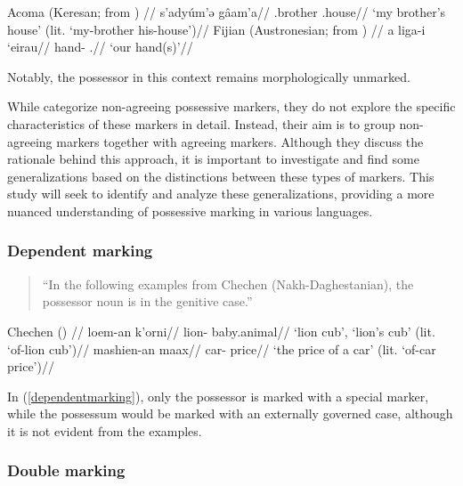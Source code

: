 \pex\label{headmarking}
\a
\begingl
\glpreamble Acoma (Keresan; \citealt[177]{Miller-1965} from \citealt{nichols_locus_2013}) //
\gla s'adyúm'ə gâam'a//
\glb \Fsg.brother \Tsg.house//
\glft `my brother's house' (lit. `my-brother his-house')//
\endgl
\a
\begingl
\glpreamble Fijian (Austronesian; \citealt[36]{Dixon-1988} from \citealt{nichols_locus_2013}) //
\gla a liga-i ‘eirau//
\glb \Art{} hand-\Poss{} \Fdu.\Excl{}//
\glft `our hand(s)'//
\endgl

\xe 

Notably, the possessor in this context remains morphologically unmarked.

While \cite{nichols_locus_2013} categorize non-agreeing possessive markers, they do not explore the specific characteristics of these markers in detail. Instead, their aim is to group non-agreeing markers together with agreeing markers. Although they discuss the rationale behind this approach, it is important to investigate and find some generalizations based on the distinctions between these types of markers. This study will seek to identify and analyze these generalizations, providing a more nuanced understanding of possessive marking in various languages.


\subsubsection{Dependent marking}

\begin{quote}
    ``In the following examples from Chechen (Nakh-Daghestanian), the possessor noun is in the genitive case.'' \citep{nichols_locus_2013}
\end{quote}


\pex\label{dependentmarking}
\glpreamble Chechen (\citealt{nichols_locus_2013}) //
\a
\begingl
\gla loem-an k'orni//
\glb lion-\Gen{} baby.animal//
\glft `lion cub’, `lion's cub’ (lit. `of-lion cub’)//
\endgl
\a
\begingl
\gla mashien-an maax//
\glb car-\Gen{} price//
\glft `the price of a car' (lit. `of-car price')// 
\endgl
\xe

In (\ref{dependentmarking}), only the possessor is marked with a special marker, while the possessum would be marked with an externally governed case, although it is not evident from the examples.

\subsubsection{Double marking}

